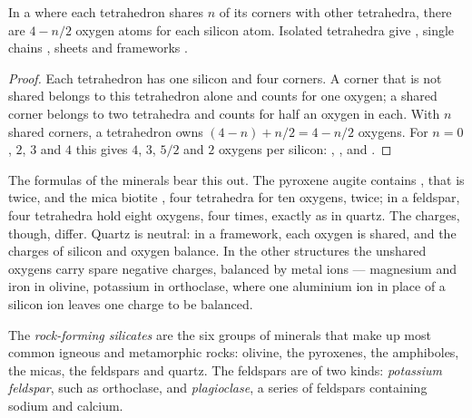 \begin{proposition}\label{prop:g11:minerals:sharing}
In a  where each tetrahedron shares $n$ of its corners with other
tetrahedra, there are $4 - n/2$ oxygen atoms for each silicon atom. Isolated
tetrahedra give , single chains , sheets  and
frameworks .
\end{proposition}

\begin{proof}
Each tetrahedron has one silicon and four corners. A corner that is not
shared belongs to this tetrahedron alone and counts for one oxygen; a shared
corner belongs to two tetrahedra and counts for half an oxygen in each. With
$n$ shared corners, a tetrahedron owns $(4 - n) + n/2 = 4 - n/2$ oxygens.
For $n = 0$, $2$, $3$ and $4$ this gives $4$, $3$, $5/2$ and $2$ oxygens
per silicon: , ,  and .
\end{proof}

The formulas of the minerals bear this out. The pyroxene augite contains
, that is  twice, and the mica biotite ,
four tetrahedra for ten oxygens,  twice; in a feldspar, four
tetrahedra hold eight oxygens,  four times, exactly as in quartz.
The charges, though, differ. Quartz is neutral: in a framework, each oxygen
is shared, and the charges of silicon and oxygen balance. In the other
structures the unshared oxygens carry spare negative charges, balanced by
metal ions --- magnesium and iron in olivine, potassium in orthoclase, where
one aluminium ion  in place of a silicon ion  leaves
one charge to be balanced.

\begin{definition}\label{def:g11:minerals:rock-forming}
The \emph{rock-forming silicates} are the six
groups of  minerals that make up most common igneous and
metamorphic rocks: olivine, the pyroxenes, the amphiboles, the micas, the
feldspars and quartz. The feldspars are of two kinds: \emph{potassium
feldspar}, such as orthoclase, and \emph{plagioclase}, a series of
feldspars containing sodium and calcium.
\end{definition}

